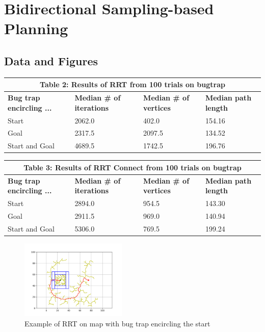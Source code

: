 \documentclass{article}
\begin{document}
\section{Bidirectional Sampling-based Planning}
\subsection{Data and Figures}\label{sub:Data and Figures 2} %
\begin{table}[h!]
    \centering
    \begin{tabularx}{\textwidth}{|X|X|X|X|}
        \hline
        \multicolumn{4}{|c|}{\textbf{Table 2: Results of RRT from 100 trials on
        bugtrap}} \\ \hline
        \textbf{Bug trap encircling ...} & 
        \textbf{Median \# of iterations} & 
        \textbf{Median \# of vertices} & 
        \textbf{Median path length} \\ \hline
        Start & 2062.0 & 402.0 & 154.16 \\ \hline
        Goal  & 2317.5 & 2097.5 & 134.52 \\ \hline
        Start and Goal  & 4689.5 & 1742.5  & 196.76 \\ \hline
    \end{tabularx}
\end{table}
\begin{table}[h!]
    \centering
    \begin{tabularx}{\textwidth}{|X|X|X|X|}
        \hline
        \multicolumn{4}{|c|}{\textbf{Table 3: Results of RRT Connect from 100 trials on
        bugtrap}} \\ \hline
        \textbf{Bug trap encircling ...} & 
        \textbf{Median \# of iterations} & 
        \textbf{Median \# of vertices} & 
        \textbf{Median path length} \\ \hline
        Start & 2894.0 & 954.5 & 143.30 \\ \hline
        Goal  & 2911.5 & 969.0 & 140.94 \\ \hline
        Start and Goal  & 5306.0 & 769.5  & 199.24 \\ \hline
    \end{tabularx}
\end{table}
\begin{figure}[H]
    \begin{center}
        \includegraphics[width=0.45\textwidth]{figures/final_path_RRT_3.png}
    \end{center}
    \caption{Example of RRT on map with bug trap encircling the start}\label{fig:RRT_3}
\end{figure}
\end{document}
